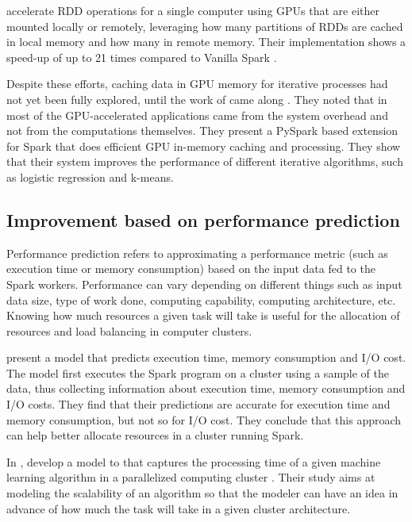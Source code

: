 \documentclass{article}
\begin{document}
\citeauthor{Ohno2017} accelerate RDD operations for a single computer using GPUs that are either mounted locally or remotely, leveraging how many partitions of RDDs are cached in local memory and how many in remote memory. Their implementation shows a speed-up of up to 21 times compared to Vanilla Spark \cite{Ohno2017}.

Despite these efforts, caching data in GPU memory for iterative processes had not yet been fully explored, until the work of \citeauthor{Hong2017} came along \cite{Hong2017}. They noted that in most of the GPU-accelerated applications came from the system overhead and not from the computations themselves. They present a PySpark based extension for Spark that does efficient GPU in-memory caching and processing. They show that their system improves the performance of different iterative algorithms, such as logistic regression and k-means.


\subsection{Improvement based on performance prediction}

Performance prediction refers to approximating a performance metric (such as execution time or memory consumption) based on the input data fed to the Spark workers. Performance can vary depending on different things such as input data size, type of work done, computing capability, computing architecture, etc. Knowing how much resources a given task will take is useful for the allocation of resources and load balancing in computer clusters.

\citeauthor{wang2015performance} \cite{wang2015performance} present a model that predicts execution time, memory consumption and I/O cost. The model first executes the Spark program on a cluster using a sample of the data, thus collecting information about execution time, memory consumption and I/O costs. They find that their predictions are accurate for execution time and memory consumption, but not so for I/O cost. They conclude that this approach can help better allocate resources in a cluster running Spark.

In \citeyear{Ulanov2017}, \citeauthor{Ulanov2017} develop a model to that captures the processing time of a given machine learning algorithm in a parallelized computing cluster \cite{Ulanov2017}. Their study aims at modeling the scalability of an algorithm so that the modeler can have an idea in advance of how much the task will take in a given cluster architecture.
\end{document}
